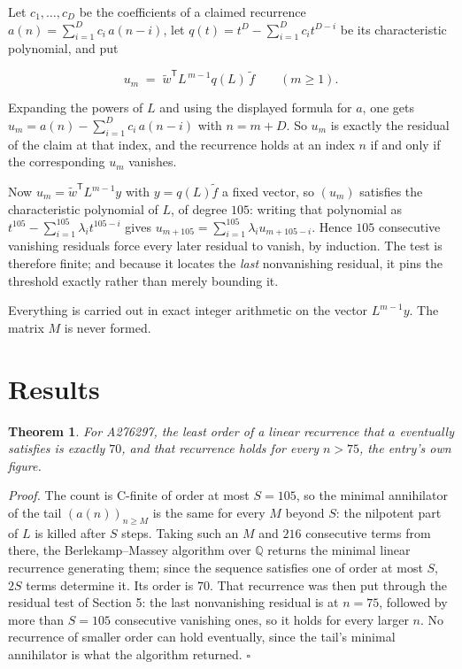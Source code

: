 \documentclass[11pt]{article}
\newtheorem{theorem}{Theorem}
\theoremstyle{definition}
\begin{document}
Let $c_1,\dots,c_D$ be the coefficients of a claimed recurrence $a(n) = \sum_{i=1}^{D} c_i\,a(n-i)$, let $q(t) = t^{D} - \sum_{i=1}^{D} c_i t^{D-i}$ be its characteristic polynomial, and put

\[u_m \;=\; \tilde w^{\mathsf T} L^{\,m-1} q(L)\,\tilde f \qquad (m \ge 1).\]

Expanding the powers of $L$ and using the displayed formula for $a$, one gets $u_m = a(n) - \sum_{i=1}^{D} c_i\,a(n-i)$ with $n = m + D$. So $u_m$ is exactly the residual of the claim at that index, and the recurrence holds at an index $n$ if and only if the corresponding $u_m$ vanishes.

Now $u_m = \tilde w^{\mathsf T} L^{m-1} y$ with $y = q(L)\tilde f$ a fixed vector, so $(u_m)$ satisfies the characteristic polynomial of $L$, of degree $105$: writing that polynomial as $t^{105} - \sum_{i=1}^{105} \lambda_i t^{105-i}$ gives $u_{m+105} = \sum_{i=1}^{105} \lambda_i u_{m+105-i}$. Hence $105$ consecutive vanishing residuals force every later residual to vanish, by induction. The test is therefore finite; and because it locates the {\itshape last} nonvanishing residual, it pins the threshold exactly rather than merely bounding it.

Everything is carried out in exact integer arithmetic on the vector $L^{m-1}y$. The matrix $M$ is never formed.

\section{Results}

\begin{theorem} For A276297, the least order of a linear recurrence that $a$ eventually satisfies is exactly $70$, and that recurrence holds for every $n > 75$, the entry's own figure.\end{theorem}

{\itshape Proof.} The count is C-finite of order at most $S = 105$, so the minimal annihilator of the tail $(a(n))_{n \ge M}$ is the same for every $M$ beyond $S$: the nilpotent part of $L$ is killed after $S$ steps. Taking such an $M$ and $216$ consecutive terms from there, the Berlekamp--Massey algorithm over $\mathbb{Q}$ returns the minimal linear recurrence generating them; since the sequence satisfies one of order at most $S$, $2S$ terms determine it. Its order is $70$. That recurrence was then put through the residual test of Section 5: the last nonvanishing residual is at $n = 75$, followed by more than $S = 105$ consecutive vanishing ones, so it holds for every larger $n$. No recurrence of smaller order can hold eventually, since the tail's minimal annihilator is what the algorithm returned. $\square$
\end{document}
